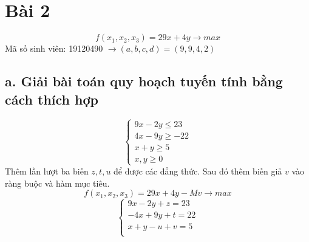 \documentclass[12pt,a4paper]{article}
\begin{document}
	\section*{Bài 2}
		\[f(x_1, x_2, x_3) = 29x + 4y \rightarrow max\]
		Mã số sinh viên: 19120490 $\rightarrow (a, b, c, d) = (9, 9, 4, 2)$
		\subsection*{a. Giải bài toán quy hoạch tuyến tính bằng cách thích hợp}
			\[\begin{cases}
				9x - 2y \leq 23\\
				4x - 9y \geq -22\\
				x + y \geq 5\\
				x, y \geq 0
			\end{cases}\]
			Thêm lần lượt ba biến $z, t, u$ để được các đẳng thức. Sau đó thêm biến giả $v$ vào ràng buộc và hàm mục tiêu.
			\[f(x_1, x_2, x_3) = 29x + 4y - Mv \rightarrow max\]
			\[\begin{cases}
				9x - 2y + z = 23\\
				-4x + 9y + t = 22\\
				x + y - u + v = 5\\
			\end{cases}\]
\end{document}
